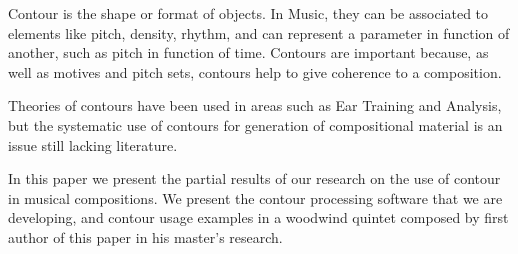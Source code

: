 Contour is the shape or format of objects. In Music, they can be
associated to elements like pitch, density, rhythm, and can represent
a parameter in function of another, such as pitch in function of time.
Contours are important because, as well as motives and pitch sets,
contours help to give coherence to a composition.

Theories of contours have been used in areas such as Ear Training and
Analysis, but the systematic use of contours for generation of
compositional material is an issue still lacking literature.

In this paper we present the partial results of our research on the
use of contour in musical compositions. We present the contour
processing software that we are developing, and contour usage examples
in a woodwind quintet composed by first author of this paper in his
master's research.
